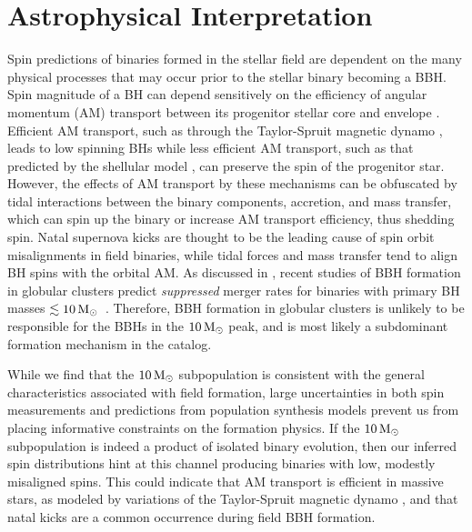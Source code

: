 \section{Astrophysical Interpretation} \label{sec:astro}


Spin predictions of binaries formed in the stellar field are dependent on the many physical processes that may occur prior to the stellar binary becoming a BBH.  Spin magnitude of a BH can depend sensitively on the efficiency of angular momentum (AM) transport between its progenitor stellar core and envelope \citep{2203.02515}. Efficient AM transport, such as through the Taylor-Spruit magnetic dynamo \citep{10.1051/0004-6361:20011465}, leads to low spinning BHs \citep{10.3847/2041-8213/ab339b} while less efficient AM transport, such as that predicted by the shellular model \citep{1992A&A...265..115Z,2012A&A...537A.146E,10.3847/1538-4365/aacb24,2019MNRAS.485.4641C}, can preserve the spin of the progenitor star. However, the effects of AM transport by these mechanisms can be obfuscated by tidal interactions between the binary components, accretion, and mass transfer, which can spin up the binary or increase AM transport efficiency, thus shedding spin. Natal supernova kicks are thought to be the leading cause of spin orbit misalignments in field binaries, while tidal forces and mass transfer tend to align BH spins with the orbital AM. As discussed in \citet{2111.03634}, recent studies of BBH formation in globular clusters predict \emph{suppressed} merger rates for binaries with primary BH masses $\lesssim 10 {\,\rm M}_\odot$~\citep{2009.01861,1906.10260,1808.04514}.  Therefore, BBH formation in globular clusters is unlikely to be responsible for the BBHs in the $10{\,\rm M}_\odot$ peak, and is most likely a subdominant formation mechanism in the catalog.

While we find that the $10{\,\rm M}_\odot$ subpopulation is consistent with the general characteristics associated with field formation, large uncertainties in both spin measurements and predictions from population synthesis models prevent us from placing informative constraints on the formation physics. If the $10{\,\rm M}_\odot$ subpopulation is indeed a product of isolated binary evolution, then our inferred spin distributions hint at this channel producing binaries with low, modestly misaligned spins. This could indicate that AM transport is efficient in massive stars, as modeled by variations of the Taylor-Spruit magnetic dynamo \citep{1706.07053}, and that natal kicks are a common occurrence during field BBH formation.


